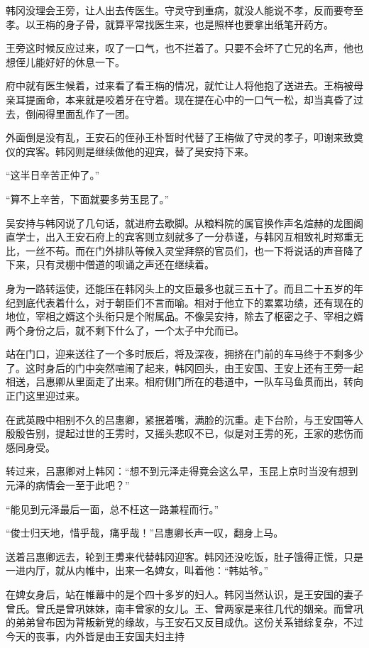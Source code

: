 韩冈没理会王旁，让人出去传医生。守灵守到重病，就没人能说不孝，反而要夸至孝。以王栴的身子骨，就算平常找医生来，也是照样也要拿出纸笔开药方。

王旁这时候反应过来，叹了一口气，也不拦着了。只要不会坏了亡兄的名声，他也想侄儿能好好的休息一下。

府中就有医生候着，过来看了看王栴的情况，就忙让人将他抱了送进去。王栴被母亲耳提面命，本来就是咬着牙在守着。现在提在心中的一口气一松，却当真昏了过去，倒闹得里面乱作了一团。

外面倒是没有乱，王安石的侄孙王朴暂时代替了王栴做了守灵的孝子，叩谢来致奠仪的宾客。韩冈则是继续做他的迎宾，替了吴安持下来。

“这半日辛苦正仲了。”

“算不上辛苦，下面就要多劳玉昆了。”

吴安持与韩冈说了几句话，就进府去歇脚。从粮料院的属官换作声名煊赫的龙图阁直学士，出入王安石府上的宾客则立刻就多了一分恭谨，与韩冈互相致礼时郑重无比，一丝不苟。而在门外排队等候入灵堂拜祭的官员们，也一下将说话的声音降了下来，只有灵棚中僧道的呗诵之声还在继续着。

身为一路转运使，还能压在韩冈头上的文臣最多也就三五十了。而且二十五岁的年纪到底代表着什么，对于朝臣们不言而喻。相对于他立下的累累功绩，还有现在的地位，宰相之婿这个头衔只是个附属品。不像吴安持，除去了枢密之子、宰相之婿两个身份之后，就不剩下什么了，一个太子中允而已。

站在门口，迎来送往了一个多时辰后，将及深夜，拥挤在门前的车马终于不剩多少了。这时身后的门中突然喧闹了起来，韩冈回头，由王安国、王安上还有王旁一起相送，吕惠卿从里面走了出来。相府侧门所在的巷道中，一队车马鱼贯而出，转向正门这里迎过来。

在武英殿中相别不久的吕惠卿，紧抿着嘴，满脸的沉重。走下台阶，与王安国等人殷殷告别，提起过世的王雱时，又摇头悲叹不已，似是对王雱的死，王家的悲伤而感同身受。

转过来，吕惠卿对上韩冈：“想不到元泽走得竟会这么早，玉昆上京时当没有想到元泽的病情会一至于此吧？”

“能见到元泽最后一面，总不枉这一路兼程而行。”

“俊士归天地，惜乎哉，痛乎哉！”吕惠卿长声一叹，翻身上马。

送着吕惠卿远去，轮到王旉来代替韩冈迎客。韩冈还没吃饭，肚子饿得正慌，只是一进内厅，就从内帷中，出来一名婢女，叫着他：“韩姑爷。”

在婢女身后，站在帷幕中的是个四十多岁的妇人。韩冈当然认识，是王安国的妻子曾氏。曾氏是曾巩妹妹，南丰曾家的女儿。王、曾两家是来往几代的姻亲。而曾巩的弟弟曾布因为背叛新党的缘故，与王安石又反目成仇。这份关系错综复杂，不过今天的丧事，内外皆是由王安国夫妇主持


